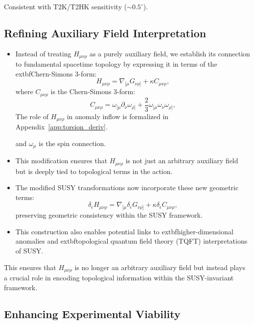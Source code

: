 \documentclass[12pt, onecolumn]{article}
\theoremstyle{definition}
\numberwithin{equation}{section}
\begin{document}
Consistent with T2K/T2HK sensitivity (\(\sim 0.5^\circ\)).

\subsection{Refining Auxiliary Field Interpretation}

\begin{itemize}
\item Instead of treating $H_{\mu\nu\rho}$ as a purely auxiliary field, we establish its connection to fundamental spacetime topology by expressing it in terms of the 	extbf{Chern-Simons 3-form}:
\begin{equation}
H_{\mu\nu\rho} = \nabla_{[\mu} G_{\nu\rho]} + \kappa C_{\mu\nu\rho},
\end{equation}
where $C_{\mu\nu\rho}$ is the Chern-Simons 3-form:
\begin{equation}
C_{\mu\nu\rho} = \omega_{[\mu} \partial_{\nu} \omega_{\rho]} + \frac{2}{3} \omega_{[\mu} \omega_{\nu} \omega_{\rho]},
\end{equation}
The role of \(H_{\mu\nu\rho}\) in anomaly inflow is formalized in Appendix~\ref{app:torsion_deriv}.

and $\omega_{\mu}$ is the spin connection.
\item This modification ensures that $H_{\mu\nu\rho}$ is not just an arbitrary auxiliary field but is deeply tied to topological terms in the action.
\item The modified SUSY transformations now incorporate these new geometric terms:
\begin{equation}
\delta_\epsilon H_{\mu\nu\rho} = \nabla_{[\mu} \delta_\epsilon G_{\nu\rho]} + \kappa \delta_\epsilon C_{\mu\nu\rho},
\end{equation}
preserving geometric consistency within the SUSY framework.
\item This construction also enables potential links to 	extbf{higher-dimensional anomalies} and 	extbf{topological quantum field theory} (TQFT) interpretations of SUSY.
\end{itemize}

This ensures that $H_{\mu\nu\rho}$ is no longer an arbitrary auxiliary field but instead plays a crucial role in encoding topological information within the SUSY-invariant framework.

\subsection{Enhancing Experimental Viability}
\end{document}
